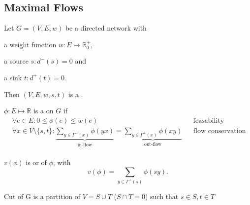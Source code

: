 

\subsection*{Maximal Flows}

\def\dminus{\ensuremath{d^{-}}}
\def\dplus{\ensuremath{d^{+}}}
\def\real{\mathbb{R}}
\def\natural{\mathbb{N}}
\def\Gammaplus{\ensuremath{\Gamma^{+}}}
\def\Gammaminus{\ensuremath{\Gamma^{-}}}

\begin{definition}
Let $G=(V,E,w)$ be a directed network with
\begin{compactitem}
\item a weight function $w: E\mapsto \real_0^{+}$,
\item a source $s: \dminus(s) = 0$ and
\item a sink $t: \dplus(t) = 0$.
\end{compactitem}
Then $(V, E, w, s, t)$ is a .
\end{definition}

\begin{definition}
$\phi: E\mapsto \real$ is a  on $G$ if
\begin{align*}
  &\forall e\in E: 0 ≤ \phi(e) ≤ w(e)
     &&\text{feasability condition} \\
  &\forall x\in V\setminus\{s,t\}:
     \underbrace{\sum_{y\in \Gammaminus(x)} \phi(yx)}_{\text{in-flow}} =
     \underbrace{\sum_{y\in \Gammaplus(x)} \phi(xy)}_{\text{out-flow}}
     &&\text{flow conservation condition} \\
\end{align*}
\end{definition}

\begin{definition}
$v(\phi)$ is  or  of $\phi$, with
\[
  v(\phi) = \sum_{y\in \Gammaplus(s)} \phi(sy).
\]
\end{definition}



\begin{definition}
Cut of G is a partition of $V=S \cup T$ ($S\cap T=0$) such that
$s \in S,t \in T$
\end{definition}


